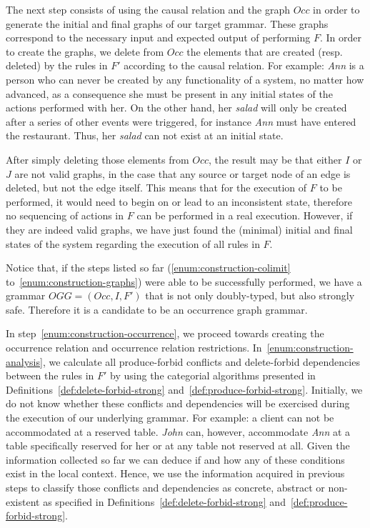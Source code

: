 The next step consists of using the causal relation and the graph $Occ$ in order to generate the initial and final graphs of our target grammar. These graphs correspond to the necessary input and expected output of performing $F$. In order to create the graphs, we delete from $Occ$ the elements that are created (resp. deleted) by the rules in $F'$ according to the causal relation. For example: \textit{Ann} is a person who can never be created by any functionality of a system, no matter how
advanced, as a consequence she must be present in any initial states of the actions performed with her. On the other hand, her \textit{salad} will only be created after a series of other events were triggered, for instance \textit{Ann} must have entered the restaurant. Thus, her \textit{salad} can not exist at an initial state.

After simply deleting those elements from $Occ$, the result may be that either $I$ or $J$ are not valid graphs, in the case that any source or target node of an edge is deleted, but not the edge itself. This means that for the execution of $F$ to be performed, it would need to begin on or lead to an inconsistent state, therefore no sequencing of actions in $F$ can be performed in a real execution. However, if they are indeed valid graphs, we have just found the (minimal) initial and final states of the system regarding the execution of all rules in $F$.

Notice that, if the steps listed so far (\ref{enum:construction-colimit} to~\ref{enum:construction-graphs}) were able to be successfully performed, we have a grammar \mbox{$OGG = \left(Occ, I, F'\right)$} that is not only doubly-typed, but also strongly safe. Therefore it is a candidate to be an occurrence graph grammar.

In step~\ref{enum:construction-occurrence}, we proceed towards creating the occurrence relation and occurrence relation restrictions. In~\ref{enum:construction-analysis}, we calculate all produce-forbid conflicts and delete-forbid dependencies between the rules in $F'$ by using the categorial algorithms presented in Definitions~\ref{def:delete-forbid-strong} and~\ref{def:produce-forbid-strong}. Initially, we do not know whether these conflicts and dependencies will be exercised during the execution of our underlying grammar. For example: a client can not be accommodated at a reserved table. \textit{John} can, however, accommodate \textit{Ann} at a table specifically reserved for her or at any table not reserved at all. Given the information collected so far we can deduce if and how any of these conditions exist in the local context. Hence, we use the information acquired in previous steps to classify those conflicts and dependencies as concrete, abstract or non-existent as specified in
Definitions~\ref{def:delete-forbid-strong} and~\ref{def:produce-forbid-strong}.

